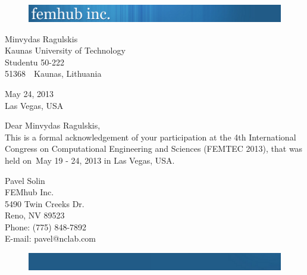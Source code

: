 \documentclass[12pt]{article}
\makeatletter
\newcommand{\certificate}[6]
{
	\begin{figure}[h!]
		\includegraphics[width=\textwidth]{femhub_logo.png}
	\end{figure}

	\vspace{50pt}
	
	\noindent
	{#1}\\
	{#2}\\
	{#3}\\
	{#4}\ \ {#5}, {#6}\\
	\vspace{50pt}
	
	\begin{flushright}
		May 24, 2013\\
		Las Vegas, USA
	\end{flushright}
	\vspace{30pt}
	
	\noindent Dear {#1},\\

	This is a formal acknowledgement of your participation at the 4th International Congress on Computational Engineering and Sciences (FEMTEC 2013), that was held on~May 19 - 24, 2013 in Las Vegas, USA.
	\vspace{100pt}

	\noindent
	Pavel Solin\\
	FEMhub Inc.\\
	5490 Twin Creeks Dr.\\
	Reno, NV 89523\\
	Phone: (775) 848-7892\\
	E-mail: pavel@nclab.com\\
	
	\begin{figure}[h!]
		\includegraphics[width=\textwidth]{femhub_footer.png}
	\end{figure}
	\newpage
}
\makeatother
\begin{document}
\pagestyle{empty}

\certificate{Minvydas Ragulskis}{Kaunas University of Technology}{Studentu 50-222}{51368}{Kaunas}{Lithuania}
\end{document}
